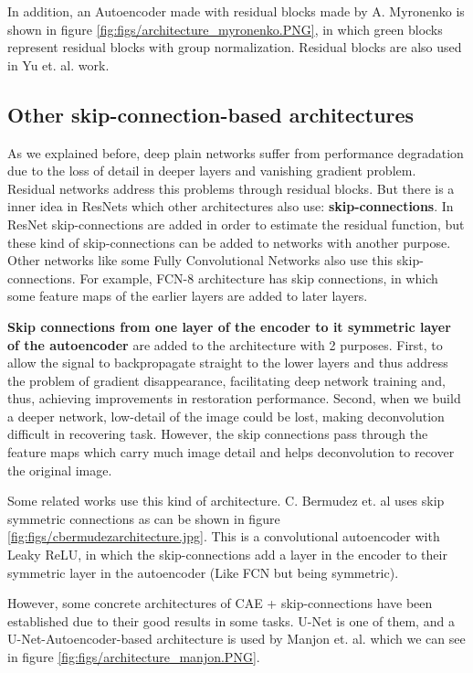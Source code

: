 In addition, an Autoencoder made with residual blocks made by A. Myronenko \cite{myronenko20183d} is shown in figure \ref{fig:figs/architecture_myronenko.PNG}, in which green blocks represent residual blocks with group normalization. Residual blocks are also used in Yu et. al. \cite{learnvolrepreCODE} work. 




\subsection{Other skip-connection-based architectures}

As we explained before, deep plain networks suffer from performance degradation due to the loss of detail in deeper layers and vanishing gradient problem. Residual networks address this problems through residual blocks. But there is a inner idea in ResNets which other architectures also use: \textbf{skip-connections}. In ResNet skip-connections are added in order to estimate the residual function, but these kind of skip-connections can be added to networks with another purpose. Other networks like some Fully Convolutional Networks also use this skip-connections. For example, FCN-8 architecture has skip connections, in which some feature maps of the earlier layers are added to later layers.

\textbf{Skip connections from one layer of the encoder to it symmetric layer of the autoencoder} are added to the architecture with 2 purposes. First, to allow the signal to backpropagate straight to the lower layers and thus address the problem of gradient disappearance, facilitating deep network training and, thus, achieving improvements in restoration performance. Second, when we build a deeper network, low-detail of the image could be lost, making deconvolution difficult in recovering task. However, the skip connections pass through the feature maps which carry much image detail and helps deconvolution to recover the original image. 

Some related works use this kind of architecture. C. Bermudez et. al \cite{bermudez2018t1autoencoder} uses skip symmetric connections as can be shown in figure \ref{fig:figs/cbermudezarchitecture.jpg}. This is a convolutional autoencoder with Leaky ReLU, in which the skip-connections add a layer in the encoder to their symmetric layer in the autoencoder (Like FCN but being symmetric).

However, some concrete architectures of CAE + skip-connections have been established due to their good results in some tasks. U-Net \cite{ronneberger2015unet} is one of them, and a U-Net-Autoencoder-based architecture is used by Manjon et. al. \cite{2020inpainting} which we can see in figure \ref{fig:figs/architecture_manjon.PNG}. 




